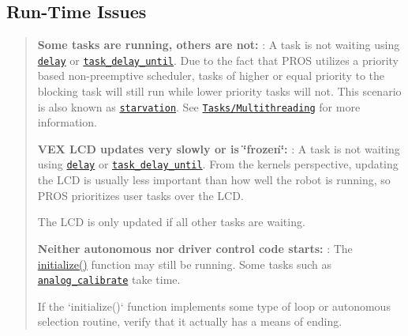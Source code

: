 \subsection*{Run-\/\+Time Issues}

\begin{quote}

\begin{DoxyItemize}
\item {\bfseries Some tasks are running, others are not\+:} \+: A task is not waiting using \href{../../api/c/rtos.html#delay}{\tt delay} or \href{../../api/c/rtos.html#task-delay-until}{\tt task\+\_\+delay\+\_\+until}. Due to the fact that P\+R\+OS utilizes a priority based non-\/preemptive scheduler, tasks of higher or equal priority to the blocking task will still run while lower priority tasks will not. This scenario is also known as \href{https://en.wikipedia.org/wiki/Starvation_(computer_science)}{\tt starvation}. See \href{/tutorials/topical/multitasking}{\tt Tasks/\+Multithreading} for more information.
\item {\bfseries V\+EX L\+CD updates very slowly or is \char`\"{}frozen\char`\"{}\+:} \+: A task is not waiting using \href{../../api/c/rtos.html#delay}{\tt delay} or \href{../../api/c/rtos.html#task-delay-until}{\tt task\+\_\+delay\+\_\+until}. From the kernel\textquotesingle{}s perspective, updating the L\+CD is usually less important than how well the robot is running, so P\+R\+OS prioritizes user tasks over the L\+CD. \begin{DoxyVerb}The LCD is only updated if all other tasks are waiting.
\end{DoxyVerb}

\item {\bfseries Neither autonomous nor driver control code starts\+:} \+: The {\ttfamily \hyperlink{main_8h_a9efe22aaead3a5e936b5df459de02eba}{initialize()}} function may still be running. Some tasks such as \href{../../api/c/adi.html#analog-calibrate}{\tt analog\+\_\+calibrate} take time. \begin{DoxyVerb}If the `initialize()` function implements some type of loop or
autonomous selection routine, verify that it actually has a
means of ending.
\end{DoxyVerb}


\end{DoxyItemize}
\end{quote}

